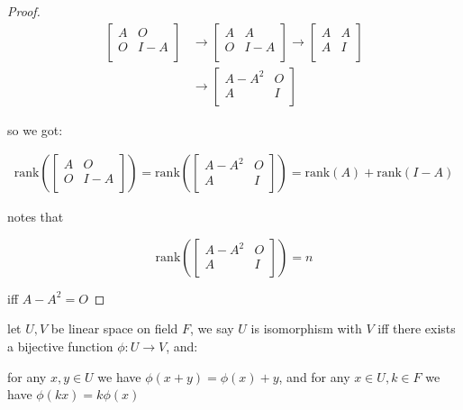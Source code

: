 \begin{proof}
    \begin{align*}
        \begin{bmatrix}
            A & O \\
            O & I-A \\
        \end{bmatrix} & \to        \begin{bmatrix}
            A & A \\
            O & I-A \\
        \end{bmatrix} \to         \begin{bmatrix}
            A & A \\
            A & I \\
        \end{bmatrix} \\
        & \to \begin{bmatrix}
            A-A^2 & O \\
            A & I \\
        \end{bmatrix}
    \end{align*}

    so we got:

    \begin{align*}
        \mathrm{rank}(    \begin{bmatrix}
            A & O \\
            O & I-A \\
        \end{bmatrix}) = \mathrm{rank}( \begin{bmatrix}
            A-A^2 & O \\
            A & I \\
        \end{bmatrix}) = \mathrm{rank}(A) + \mathrm{rank}(I- A)
    \end{align*}

    notes that

    \[
\mathrm{rank}( \begin{bmatrix}
            A-A^2 & O \\
            A & I \\
        \end{bmatrix}) = n
    \] 

    iff $A-A^2 = O$

 
\end{proof}

\begin{definition}[isomorphism]
    let $U, V$ be linear space on field $F$, we say $U$ is isomorphism with $V$ iff there exists a bijective function $\phi: U \to V$, and:
    
    for any $x, y \in U$ we have $\phi(x + y) = \phi(x) + y$, and for any $x \in U, k \in F$
    we have $\phi(kx) = k\phi(x)$
\end{definition}

